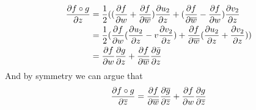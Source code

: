 \documentclass{homework}
\begin{document}
\begin{solution}
                                                                                                             \begin{align*}
                                                                                                             \frac{\partial f\circ g}{\partial z} &= \frac{1}{2}((\frac{\partial f}{\partial w} +\frac{\partial f}{\partial \overline{w}})\frac{\partial u_2}{\partial z} + (\frac{\partial f}{\partial \overline{w}} - \frac{\partial f}{\partial w})\frac{\partial v_2}{\partial z}\\
                                                                                                             &= \frac{1}{2}(\frac{\partial f}{\partial w}(\frac{\partial u_2}{\partial z} - v\frac{\partial v_2}{\partial z}) + \frac{\partial f}{\partial \overline{w}}(\frac{\partial u_2}{\partial z} + \frac{\partial v_2}{\partial z}))\\
                                                                                                             &= \frac{\partial f}{\partial w}\frac{\partial g}{\partial z} + \frac{\partial f}{\partial \overline{w}}\frac{\partial \bar{g}}{\partial z}
                                                                                                             \end{align*}
                                                                                                             And by symmetry we can argue that 
                                                                                                             \[
                                                                                                             \frac{\partial f\circ g}{\partial \overline{z}} =\frac{\partial f}{\partial \overline{w}}\frac{\partial \overline{g}}{\partial \overline{z}} + \frac{\partial f}{\partial w}\frac{\partial g}{\partial \overline{z}}
                                                                                                             \]
                                                                                                             \end{solution}
\end{document}
